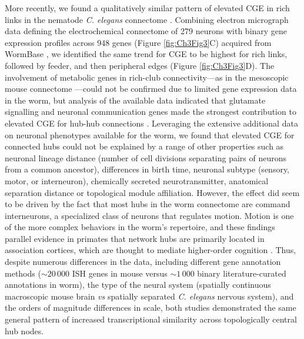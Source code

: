 More recently, we found a qualitatively similar pattern of elevated CGE in rich links in the nematode \textit{C. elegans} connectome \citep{Arnatkeviciute2018}.
Combining electron micrograph data defining the electrochemical connectome of 279 neurons \citep{Varshney2011} with binary gene expression profiles across 948 genes (Figure \ref{fig:Ch3Fig3}C) acquired from WormBase \citep{Harris2010}, we identified the same trend for CGE to be highest for rich links, followed by feeder, and then peripheral edges (Figure \ref{fig:Ch3Fig3}D).
The involvement of metabolic genes in rich-club connectivity---as in the mesoscopic mouse connectome \citep{Fulcher2016}---could not be confirmed due to limited gene expression data in the worm, but analysis of the available data indicated that glutamate signalling and neuronal communication genes made the strongest contribution to elevated CGE for hub-hub connections \citep{Arnatkeviciute2018}.
Leveraging the extensive additional data on neuronal phenotypes available for the worm, we found that elevated CGE for connected hubs could not be explained by a range of other properties such as neuronal lineage distance (number of cell divisions separating pairs of neurons from a common ancestor), differences in birth time, neuronal subtype (sensory, motor, or interneuron), chemically secreted neurotransmitter, anatomical separation distance or topological module affiliation. However, the effect did seem to be driven by the fact that most hubs in the worm connectome are command interneurons, a specialized class of neurons that regulates motion. Motion is one of the more complex behaviors in the worm’s repertoire, and these findings parallel evidence in primates that network hubs are primarily located in association cortices, which are thought to mediate higher-order cognition \citep{Achard2006,Sporns2007}.
Thus, despite numerous differences in the data, including different gene annotation methods ($\sim20\,000$ ISH genes in mouse versus $\sim1\,000$ binary literature-curated annotations in worm), the type of the neural system (spatially continuous macroscopic mouse brain \textit{vs} spatially separated \textit{C. elegans} nervous system), and the orders of magnitude differences in scale, both studies demonstrated the same general pattern of increased transcriptional similarity across topologically central hub nodes.

